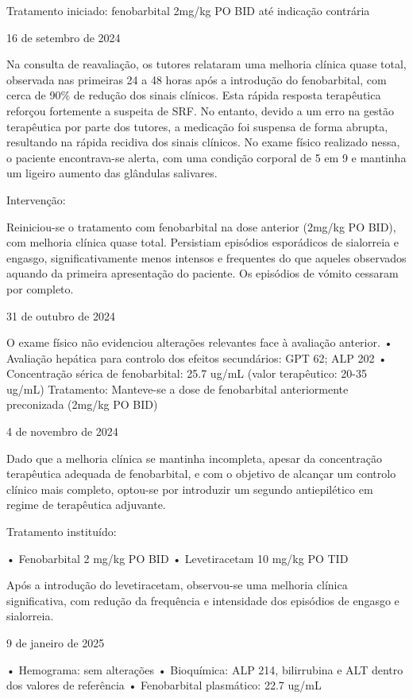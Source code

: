Tratamento iniciado: fenobarbital 2mg/kg PO BID até indicação contrária


16 de setembro de 2024


Na consulta de reavaliação, os tutores relataram uma melhoria clínica quase total, observada nas primeiras 24 a 48 horas após a introdução do fenobarbital, com cerca de 90\% de redução dos sinais clínicos. Esta rápida resposta terapêutica reforçou fortemente a suspeita de SRF. No entanto, devido a um erro na gestão terapêutica por parte dos tutores, a medicação foi suspensa de forma abrupta, resultando na rápida recidiva dos sinais clínicos.
No exame físico realizado nessa, o paciente encontrava-se alerta, com uma condição corporal de 5 em 9 e mantinha um ligeiro aumento das glândulas salivares.


Intervenção:


Reiniciou-se o tratamento com fenobarbital na dose anterior (2mg/kg PO BID), com melhoria clínica quase total. Persistiam episódios esporádicos de sialorreia e engasgo, significativamente menos intensos e frequentes do que aqueles observados aquando da primeira apresentação do paciente. Os episódios de vómito cessaram por completo.


31 de outubro de 2024


O exame físico não evidenciou alterações relevantes face à avaliação anterior. 
•	Avaliação hepática para controlo dos efeitos secundários: GPT 62; ALP 202
•	Concentração sérica de fenobarbital: 25.7 ug/mL (valor terapêutico: 20-35 ug/mL)
Tratamento: Manteve-se a dose de fenobarbital anteriormente preconizada (2mg/kg PO BID)


4 de novembro de 2024


Dado que a melhoria clínica se mantinha incompleta, apesar da concentração terapêutica adequada de fenobarbital, e com o objetivo de alcançar um controlo clínico mais completo, optou-se por introduzir um segundo antiepilético em regime de terapêutica adjuvante.


Tratamento instituído: 


•	Fenobarbital 2 mg/kg PO BID
•	Levetiracetam 10 mg/kg PO TID


Após a introdução do levetiracetam, observou-se uma melhoria clínica significativa, com redução da frequência e intensidade dos episódios de engasgo e sialorreia.


9 de janeiro de 2025


•	Hemograma: sem alterações
•	Bioquímica: ALP 214, bilirrubina e ALT dentro dos valores de referência
•	Fenobarbital plasmático: 22.7 ug/mL


